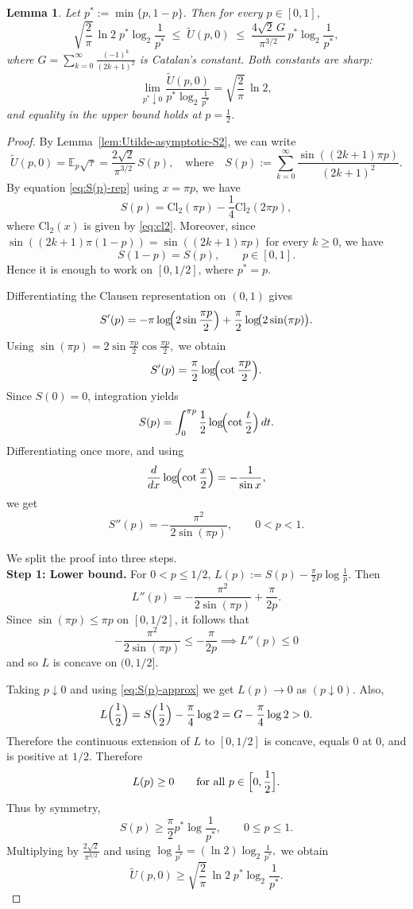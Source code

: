 \documentclass[11pt]{amsart}
\newtheorem{lemma}[theorem]{Lemma}
\theoremstyle{definition}
\renewcommand{\1}{{\mathbbm{1}}}
\begin{document}
\begin{lemma}\label{lem:Utilde-sharp-constants-S2}
Let
$
p^*:=\min\{p,1-p\}.
$ Then for every $p\in[0,1]$,
\[
\sqrt{\frac2\pi}\,\ln 2 \; p^*\log_2\frac1{p^*}
\;\le\;
\tilde U(p,0)
\;\le\;
\frac{4\sqrt2\,G}{\pi^{3/2}}\,p^*\log_2\frac1{p^*},
\]
where
$
G=\sum_{k=0}^\infty \frac{(-1)^k}{(2k+1)^2}
$
is Catalan's constant.
Both constants are sharp:
\[
\lim_{p^*\downarrow0}
\frac{\tilde U(p,0)}{p^*\log_2\frac1{p^*}}
=
\sqrt{\frac2\pi}\,\ln 2,
\]
and equality in the upper bound holds at $p=\frac12$.
\end{lemma}

\begin{proof}
By Lemma~\ref{lem:Utilde-asymptotic-S2}, we can write
\[
\tilde U(p,0)=\mathbb E_p\sqrt{\tau}
=
\frac{2\sqrt2}{\pi^{3/2}}\,S(p),
\quad
\text{where}
\quad 
S(p):=\sum_{k=0}^\infty \frac{\sin((2k+1)\pi p)}{(2k+1)^2}.
\]
By equation \eqref{eq:S(p)-rep} using $x=\pi p$, we have 
\[
S(p)=\mathrm{Cl}_2(\pi p)-\frac14 \mathrm{Cl}_2(2\pi p),
\]
where $\mathrm{Cl}_2(x)$ is given by \eqref{eq:cl2}.
Moreover, since 
$
\sin((2k+1)\pi(1-p))
=
\sin((2k+1)\pi p)
$
for every $k\ge 0$, we have
\[
S(1-p)=S(p), \qquad p\in[0,1].
\]
Hence it is enough to work on $[0,1/2]$, where $p^*=p$.

Differentiating the Clausen representation on $(0,1)$ gives
\[
S'(p)
=
-\pi\log\!\Bigl(2\sin\frac{\pi p}{2}\Bigr)
+\frac{\pi}{2}\log\!\bigl(2\sin(\pi p)\bigr).
\]
Using
$
\sin(\pi p)=2\sin\frac{\pi p}{2}\cos\frac{\pi p}{2},
$
we obtain
\[
S'(p)
=
\frac{\pi}{2}\log\!\Bigl(\cot\frac{\pi p}{2}\Bigr).
\]
Since $S(0)=0$, integration yields
\[
S(p)=\int_0^{\pi p}\frac12\log\!\Bigl(\cot\frac t2\Bigr)\,dt.
\]
Differentiating once more, and using
\[
\frac{d}{dx}\log\!\Bigl(\cot\frac x2\Bigr)=-\frac1{\sin x},
\]
we get
\[
S''(p)=-\frac{\pi^2}{2\sin(\pi p)},
\qquad 0<p<1.
\]

We split the proof into three steps.\\

\textbf{Step 1: Lower bound.}
For $0<p\le 1/2$,
$
L(p):=S(p)-\frac{\pi}{2}p\log\frac1p.
$
Then
\[
L''(p)
=
-\frac{\pi^2}{2\sin(\pi p)}+\frac{\pi}{2p}.
\]
Since $\sin(\pi p)\le \pi p$ on $[0,1/2]$, it follows that
\[
-\frac{\pi^2}{2\sin(\pi p)}\le -\frac{\pi}{2p}\implies L''(p)\le 0
\]
 and so
$L$ is concave on $(0,1/2]$.

Taking $ p\downarrow0$ and using \eqref{eq:S(p)-approx} we get
$
L(p)\to 0
$ as $ (p\downarrow0).
$
Also,
\[
L\Bigl(\frac12\Bigr)
=
S\Bigl(\frac12\Bigr)-\frac{\pi}{4}\log2
=
G-\frac{\pi}{4}\log2
>0.
\]
Therefore the continuous extension of $L$ to $[0,1/2]$ is concave, equals $0$ at $0$, and is positive at $1/2$.
Therefore
\[
L(p)\ge 0
\qquad \text{for all } p\in\Bigl[0,\frac12\Bigr].
\]
Thus 
by symmetry,
\[
S(p)\ge \frac{\pi}{2}p^*\log\frac1{p^*},
\qquad 0\le p\le 1.
\]
Multiplying by $\frac{2\sqrt2}{\pi^{3/2}}$ and using
$
\log\frac1{p^*}=(\ln2)\log_2\frac1{p^*},
$
we obtain
\[
\tilde U(p,0)\ge \sqrt{\frac2\pi}\,\ln2 \; p^*\log_2\frac1{p^*}.
\]


\end{proof}
\end{document}
